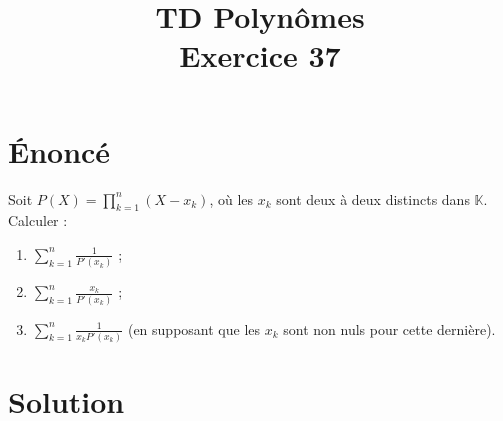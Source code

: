 \documentclass[french]{article}
\title{TD Polynômes \\ Exercice 37}
\date{}
\newcommand{\K}{\mathbb{K}}
\begin{document}
\maketitle

\section{Énoncé}
Soit $P(X)=\displaystyle\prod_{k=1}^{n}(X-x_k)$, où les $x_k$ sont deux à deux distincts dans $\K$. Calculer : 
\begin{enumerate}
	\item $\displaystyle\sum_{k=1}^{n}\frac{1}{P'(x_k)}$ ;
	\item $\displaystyle\sum_{k=1}^{n}\frac{x_k}{P'(x_k)}$ ;
	\item $\displaystyle\sum_{k=1}^{n}\frac{1}{x_kP'(x_k)}$ (en supposant que les $x_k$ sont non nuls pour cette dernière).
\end{enumerate}
\section{Solution}
\end{document}

